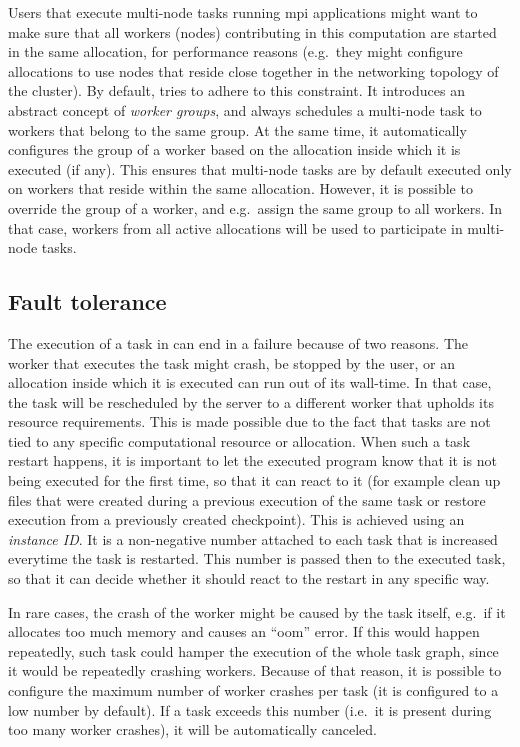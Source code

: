 Users that execute multi-node tasks running \gls{mpi} applications might want to make
sure that all workers (nodes) contributing in this computation are started in the same allocation,
for performance reasons (e.g.\ they might configure allocations to use nodes that reside close
together in the networking topology of the cluster). By default, \hyperqueue{} tries to
adhere to this constraint. It introduces an abstract concept of \emph{worker groups}, and always
schedules a multi-node task to workers that belong to the same group. At the same time, it
automatically configures the group of a worker based on the allocation inside which it is executed
(if any). This ensures that multi-node tasks are by default executed only on workers that reside
within the same allocation. However, it is possible to override the group of a worker, and e.g.\
assign the same group to all workers. In that case, workers from all active allocations will be
used to participate in multi-node tasks.


\subsection{Fault tolerance}
The execution of a task in \hyperqueue{} can end in a failure because of two reasons. The
worker that executes the task might crash, be stopped by the user, or an allocation inside which it
is executed can run out of its wall-time. In that case, the task will be rescheduled by the server
to a different worker that upholds its resource requirements. This is made possible due to the fact
that tasks are not tied to any specific computational resource or allocation. When such a task
restart happens, it is important to let the executed program know that it is not being executed for
the first time, so that it can react to it (for example clean up files that were created during a
previous execution of the same task or restore execution from a previously created checkpoint).
This is achieved using an \emph{instance ID}. It is a non-negative number attached to each
task that is increased everytime the task is restarted. This number is passed then to the executed
task, so that it can decide whether it should react to the restart in any specific way.

In rare cases, the crash of the worker might be caused by the task itself, e.g.\ if it allocates
too much memory and causes an ``\gls{oom}'' error. If this would happen repeatedly,
such task could hamper the execution of the whole task graph, since it would be repeatedly crashing
workers. Because of that reason, it is possible to configure the maximum number of worker crashes
per task (it is configured to a low number by default). If a task exceeds this number (i.e.\ it is
present during too many worker crashes), it will be automatically canceled.

